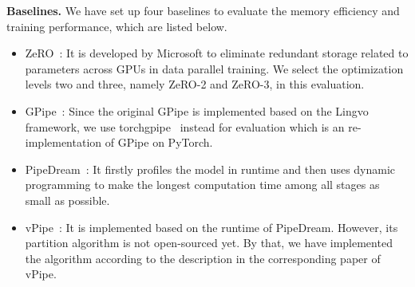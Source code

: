 \textbf{Baselines.}
We have set up four baselines to evaluate the memory efficiency and training performance, which are listed below.
\begin{itemize}
  \item ZeRO~\cite{rajbhandariZeROMemoryOptimizations2020}: It is developed by Microsoft to eliminate redundant storage related to parameters
  across GPUs in data parallel training.
  We select the optimization levels two and three, namely ZeRO-2 and ZeRO-3, in this evaluation.
  \item GPipe~\cite{huangGpipeEfficientTraining2019}: Since the original GPipe is implemented based on the Lingvo~\cite{shen2019lingvo} framework,
  we use torchgpipe~\cite{kimTorchgpipeOntheflyPipeline2020} instead for evaluation which is an re-implementation of GPipe on PyTorch.
  \item PipeDream~\cite{narayananPipeDreamGeneralizedPipeline2019}: It firstly profiles the model in runtime and then uses dynamic programming
  to make the longest computation time among all stages as small as possible.
  \item vPipe~\cite{zhaoVPipeVirtualizedAcceleration2022}: It is implemented based on the runtime of PipeDream.
  However, its partition algorithm is not open-sourced yet.
  By that, we have implemented the algorithm according to the description in the corresponding paper of vPipe.
\end{itemize}

